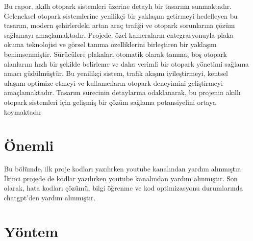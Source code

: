 \documentclass[]{article}
\begin{document}
	Bu rapor, akıllı otopark sistemleri üzerine detaylı bir tasarımı sunmaktadır. Geleneksel otopark sistemlerine yenilikçi bir yaklaşım getirmeyi hedefleyen bu tasarım, modern şehirlerdeki artan araç trafiği ve otopark sorunlarına çözüm sağlamayı amaçlamaktadır. Projede, özel kameraların entegrasyonuyla plaka okuma teknolojisi ve görsel tanıma özelliklerini birleştiren bir yaklaşım benimsenmiştir. Sürücülere plakaları otomatik olarak tanıma, boş otopark alanlarını hızlı bir şekilde belirleme ve daha verimli bir otopark yönetimi sağlama amacı güdülmüştür. Bu yenilikçi sistem, trafik akışını iyileştirmeyi, kentsel ulaşımı optimize etmeyi ve kullanıcıların otopark deneyimini geliştirmeyi amaçlamaktadır. Tasarım sürecinin detaylarına odaklanarak, bu projenin akıllı otopark sistemleri için gelişmiş bir çözüm sağlama potansiyelini ortaya koymaktadır
	
	\section{Önemli}
	Bu bölümde, ilk proje kodları yazılırken youtube kanalından yardım alınmıştır\cite{github}. İkinci projede de kodlar yazılırken youtube kanalından yardım alınmıştır\cite{youtube}. Son olarak, hata kodları çözümü, bilgi öğrenme ve kod optimizasyonu durumlarında chatgpt'den yardım alınmıştır\cite{chatgpt35}.
	
	\section{Yöntem}
\end{document}
